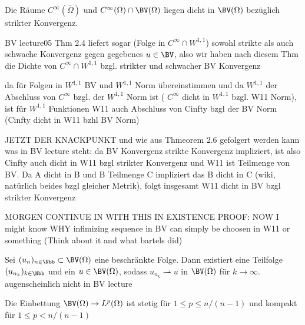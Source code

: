 \begin{theorem}
  \label{thm:approximationBySmoothFunctions}
  Die Räume $C^\infty(\overline\Omega)$ und $C^\infty(\Omega)\cap\BV(\Omega)$
  liegen dicht in $\BV(\Omega)$ bezüglich strikter Konvergenz.

  {\color{red}BV lecture05 Thm 2.4 liefert sogar (Folge in
  $C^\infty\cap W^{1,1}$) sowohl strikte als auch schwache Konvergenz gegen
  gegebenes $u\in\BV$, also wir haben nach diesem Thm die Dichte von
  $C^\infty\cap W^{1,1}$ bzgl. strikter und schwacher BV Konvergenz
  
  da für Folgen in $W^{1,1}$ BV und $W^{1,1}$ Norm übereinstimmen und da
  $W^{1,1}$ der Abschluss von $C^\infty$ bzgl. der $W^{1,1}$ Norm ist (
  $C^\infty$ dicht in $W^{ 1,1 }$ bzgl. W11 Norm), ist
  für $W^{1,1}$ Funktionen W11 auch Abschluss von Cinfty bzgl
  der BV Norm (Cinfty dicht in W11 bzhl BV Norm)
  
  JETZT DER KNACKPUNKT und wie aus Thmeorem 2.6 gefolgert werden kann was in BV lecture
  steht: da BV Konvergenz strikte Konvergenz impliziert, ist 
  also Cinfty auch dicht in W11 bzgl strikter Konvergenz und W11 ist Teilmenge
  von BV. Da A dicht in B und B Teilmenge C impliziert das B dicht in C (wiki,
  natürlich beides bzgl gleicher Metrik), folgt insgesamt W11 dicht in BV bzgl
  strikter Konvergenz
  
  MORGEN CONTINUE IN WITH THIS IN EXISTENCE PROOF: NOW I might know WHY
  infimizing sequence in BV can simply be choosen in W11 or something
  (Think about it and what bartels did)}
\end{theorem}

\begin{theorem}
  \label{thm:compactness}
  Sei $(u_n)_{n\in\Nbb}\subset \BV(\Omega)$ eine beschränkte Folge. Dann 
  existiert eine Teilfolge $(u_{n_k})_{k\in\Nbb}$ und ein $u\in\BV(\Omega)$,
  sodass $u_{n_k}\rightharpoonup u$ in $\BV(\Omega)$ für $k\rightarrow\infty$.
  {\color{red}augenscheinlich nicht in BV lecture}
\end{theorem}

\begin{theorem}
  \label{thm:embeddingBVintoLp}
  Die Einbettung $\BV(\Omega)\to L^p(\Omega)$ ist stetig für 
  $1\leq p\leq n/(n-1)$ und kompakt für $1\leq p< n/(n-1)$
\end{theorem}

